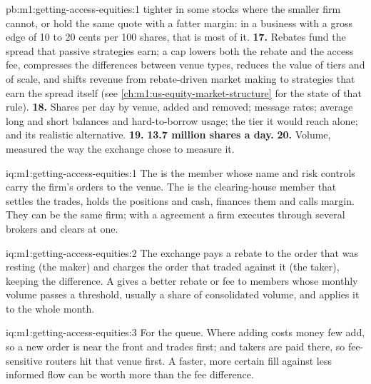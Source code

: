 \begin{solution}{pb:m1:getting-access-equities:1}
tighter in some stocks where the smaller firm cannot, or hold the same quote
with a fatter margin: in a business with a gross edge of 10 to 20 cents per
100 shares, that is most of it.
\textbf{17.} Rebates fund the spread that passive strategies earn; a cap
lowers both the rebate and the access fee, compresses the differences
between venue types, reduces the value of tiers and of scale, and shifts
revenue from rebate-driven market making to strategies that earn the spread
itself (see \cref{ch:m1:us-equity-market-structure} for the state of that
rule).
\textbf{18.} Shares per day by venue, added and removed; message rates;
average long and short balances and hard-to-borrow usage; the tier it would
reach alone; and its realistic alternative.
\textbf{19.} \textbf{13.7 million shares a day.}
\textbf{20.} Volume, measured the way the exchange chose to measure it.
\end{solution}

\begin{solution}{iq:m1:getting-access-equities:1}
The  is the member whose name and risk controls carry the
firm's orders to the venue. The  is the clearing-house member
that settles the trades, holds the positions and cash, finances them and
calls margin. They can be the same firm; with a  agreement a firm
executes through several brokers and clears at one.
\end{solution}

\begin{solution}{iq:m1:getting-access-equities:2}
The exchange pays a rebate to the order that was resting (the maker) and
charges the order that traded against it (the taker), keeping the difference.
A  gives a better rebate or fee to members whose monthly volume
passes a threshold, usually a share of consolidated volume, and applies it to
the whole month.
\end{solution}

\begin{solution}{iq:m1:getting-access-equities:3}
For the queue. Where adding costs money few add, so a new order is near the
front and trades first; and takers are paid there, so fee-sensitive routers
hit that venue first. A faster, more certain fill against less informed flow
can be worth more than the fee difference.
\end{solution}

